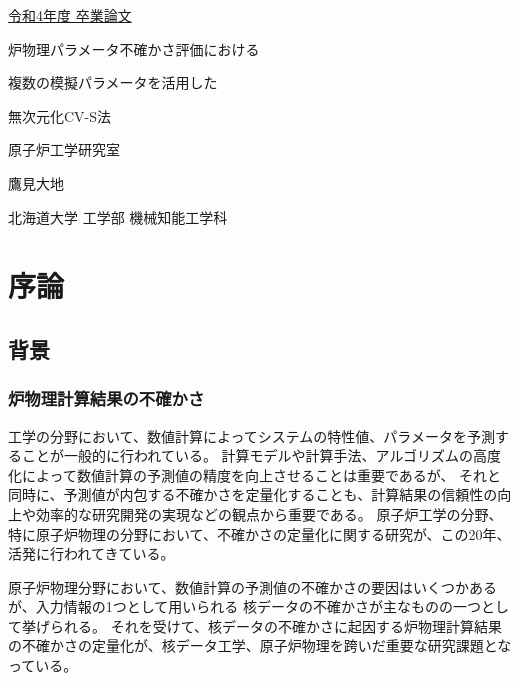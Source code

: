 \documentclass[a4paper,11pt,titlepage,uplatex]{jsreport}
\begin{document}
\begin{titlepage}
  \noindent
  \begin{flushright}
    \underline{令和4年度 \space 卒業論文}
  \end{flushright}
  \vspace{3cm}
  \begin{center}
    \fontsize{20pt}{1cm}\selectfont
    炉物理パラメータ不確かさ評価における

    複数の模擬パラメータを活用した
    
    無次元化CV-S法

    \vspace{3cm}

    \fontsize{18pt}{2cm}\selectfont
    原子炉工学研究室

    鷹見大地

    \vspace{6cm}

    \fontsize{10pt}{0cm}\selectfont
    北海道大学 工学部 機械知能工学科
    \end{center}
    
\end{titlepage}


\tableofcontents
\clearpage

\chapter{序論}
\section{背景}
\subsection{炉物理計算結果の不確かさ}
工学の分野において、数値計算によってシステムの特性値、パラメータを予測することが一般的に行われている。
計算モデルや計算手法、アルゴリズムの高度化によって数値計算の予測値の精度を向上させることは重要であるが、
それと同時に、予測値が内包する不確かさを定量化することも、計算結果の信頼性の向上や効率的な研究開発の実現などの観点から重要である。
原子炉工学の分野、特に原子炉物理の分野において、不確かさの定量化に関する研究が、この20年、活発に行われてきている。

原子炉物理分野において、数値計算の予測値の不確かさの要因はいくつかあるが、入力情報の1つとして用いられる
核データの不確かさが主なものの一つとして挙げられる。
それを受けて、核データの不確かさに起因する炉物理計算結果の不確かさの定量化が、核データ工学、原子炉物理を跨いだ重要な研究課題となっている。
\end{document}
